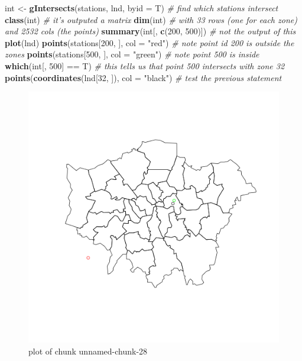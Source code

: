 \documentclass[]{article}
\makeatletter
\newenvironment{Shaded}{}{}
\newcommand{\KeywordTok}[1]{\textcolor[rgb]{0.00,0.44,0.13}{\textbf{{#1}}}}
\newcommand{\DataTypeTok}[1]{\textcolor[rgb]{0.56,0.13,0.00}{{#1}}}
\newcommand{\DecValTok}[1]{\textcolor[rgb]{0.25,0.63,0.44}{{#1}}}
\newcommand{\StringTok}[1]{\textcolor[rgb]{0.25,0.44,0.63}{{#1}}}
\newcommand{\CommentTok}[1]{\textcolor[rgb]{0.38,0.63,0.69}{\textit{{#1}}}}
\newcommand{\NormalTok}[1]{{#1}}
\def\maxwidth{\ifdim\Gin@nat@width>\linewidth\linewidth
\else\Gin@nat@width\fi}
\let\Oldincludegraphics\includegraphics
\renewcommand{\includegraphics}[1]{\Oldincludegraphics[width=\maxwidth]{#1}}
\makeatother
\begin{document}
\begin{Shaded}
\begin{Highlighting}[]
\NormalTok{int <- }\KeywordTok{gIntersects}\NormalTok{(stations, lnd, }\DataTypeTok{byid =} \NormalTok{T)  }\CommentTok{# find which stations intersect }
\KeywordTok{class}\NormalTok{(int)  }\CommentTok{# it's outputed a matrix}
\KeywordTok{dim}\NormalTok{(int)  }\CommentTok{# with 33 rows (one for each zone) and 2532 cols (the points)}
\KeywordTok{summary}\NormalTok{(int[, }\KeywordTok{c}\NormalTok{(}\DecValTok{200}\NormalTok{, }\DecValTok{500}\NormalTok{)])  }\CommentTok{# not the output of this}
\KeywordTok{plot}\NormalTok{(lnd)}
\KeywordTok{points}\NormalTok{(stations[}\DecValTok{200}\NormalTok{, ], }\DataTypeTok{col =} \StringTok{"red"}\NormalTok{)  }\CommentTok{# note point id 200 is outside the zones}
\KeywordTok{points}\NormalTok{(stations[}\DecValTok{500}\NormalTok{, ], }\DataTypeTok{col =} \StringTok{"green"}\NormalTok{)  }\CommentTok{# note point 500 is inside}
\KeywordTok{which}\NormalTok{(int[, }\DecValTok{500}\NormalTok{] == T)  }\CommentTok{# this tells us that point 500 intersects with zone 32}
\KeywordTok{points}\NormalTok{(}\KeywordTok{coordinates}\NormalTok{(lnd[}\DecValTok{32}\NormalTok{, ]), }\DataTypeTok{col =} \StringTok{"black"}\NormalTok{)  }\CommentTok{# test the previous statement}
\end{Highlighting}
\end{Shaded}
\begin{figure}[htbp]
\centering
\includegraphics{figure/unnamed-chunk-28.png}
\caption{plot of chunk unnamed-chunk-28}
\end{figure}
\end{document}
